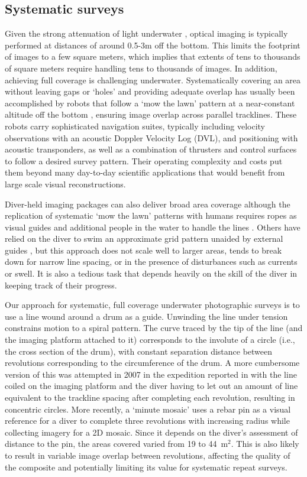 \subsection{Systematic surveys}
Given the strong attenuation of light underwater \cite{Duntley_1963}, optical imaging is typically performed at distances of around 0.5-3m off the bottom. This limits the footprint of images to a few square meters, which implies that extents of tens to thousands of square meters require handling tens to thousands of images. In addition, achieving full coverage is challenging underwater. Systematically covering an area without leaving gaps or `holes' and providing adequate overlap has usually been accomplished by robots that follow a `mow the lawn' pattern at a near-constant altitude off the bottom \cite{Bingham_2010}\cite{Williams_2010}, ensuring image overlap across parallel tracklines. These robots carry sophisticated navigation suites, typically including velocity observations with an acoustic Doppler Velocity Log (DVL), and positioning with acoustic transponders, as well as a combination of thrusters and control surfaces to follow a desired survey pattern. Their operating complexity and costs put them beyond many day-to-day scientific applications that would benefit from large scale visual reconstructions.

Diver-held imaging packages can also deliver broad area coverage although the replication of systematic `mow the lawn' patterns with humans requires ropes as visual guides and additional people in the water to handle the lines \cite{Henderson_2013}. Others have relied on the diver to swim an approximate grid pattern unaided by external guides \cite{Burns_2015}, but this approach does not scale well to larger areas, tends to break down for narrow line spacing, or in the presence of disturbances such as currents or swell. It is also a tedious task that depends heavily on the skill of the diver in keeping track of their progress.

Our approach for systematic, full coverage underwater photographic surveys is to use a line wound around a drum as a guide. Unwinding the line under tension constrains motion to a spiral pattern. The curve traced by the tip of the line (and the imaging platform attached to it) corresponds to the involute of a circle (i.e., the cross section of the drum), with constant separation distance between revolutions corresponding to the circumference of the drum. A more cumbersome version of this was attempted in 2007 in the expedition reported in \cite{Camilli_2007} with the line coiled on the imaging platform and the diver having to let out an amount of line equivalent to the trackline spacing after completing each revolution, resulting in concentric circles. More recently, a `minute mosaic' \cite{gintert2012third} uses a rebar pin as a visual reference for a diver to complete three revolutions with increasing radius while collecting imagery for a 2D mosaic. Since it depends on the diver's assessment of distance to the pin, the areas covered varied from 19 to 44~m$^{2}$. This is also likely to result in variable image overlap between revolutions, affecting the quality of the composite and potentially limiting its value for systematic repeat surveys.

